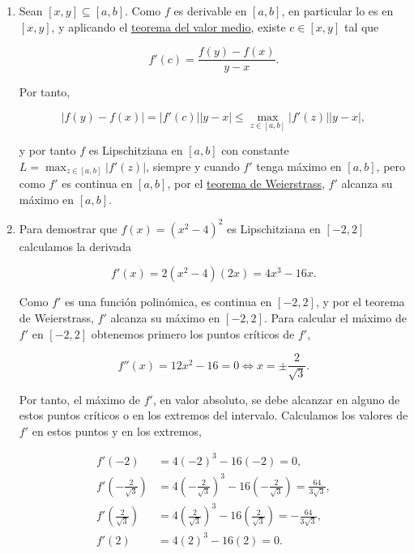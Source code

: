 \documentclass[
  spanish,
  a4paper,
]{scrreport}
\theoremstyle{definition}
\theoremstyle{remark}
\begin{document}
\begin{tcolorbox}[enhanced jigsaw, colbacktitle=quarto-callout-tip-color!10!white, opacityback=0, toptitle=1mm, title=\textcolor{quarto-callout-tip-color}{\faLightbulb}\hspace{0.5em}{Solución}, coltitle=black, opacitybacktitle=0.6, breakable, toprule=.15mm, leftrule=.75mm, titlerule=0mm, colframe=quarto-callout-tip-color-frame, left=2mm, bottomrule=.15mm, bottomtitle=1mm, arc=.35mm, rightrule=.15mm, colback=white]

\begin{enumerate}
\def\labelenumi{\alph{enumi}.}
\item
  Sean \([x,y]\subseteq [a,b]\). Como \(f\) es derivable en \([a,b]\),
  en particular lo es en \([x,y]\), y aplicando el
  \href{https://aprendeconalf.es/analisis-manual/07-derivadas.html\#thm-valor-medio}{teorema
  del valor medio}, existe \(c\in[x,y]\) tal que

  \[
  f'(c) = \frac{f(y)-f(x)}{y-x}.
  \]

  Por tanto,

  \[
  |f(y)-f(x)| = |f'(c)||y-x| \leq \max_{z\in [a,b]}|f'(z)||y-x|,
  \]

  y por tanto \(f\) es Lipschitziana en \([a,b]\) con constante
  \(L=\max_{z\in [a,b]}|f'(z)|\), siempre y cuando \(f'\) tenga máximo
  en \([a,b]\), pero como \(f'\) es continua en \([a,b]\), por el
  \href{https://aprendeconalf.es/analisis-manual/06-limites.html\#thm-weierstrass}{teorema
  de Weierstrass}, \(f'\) alcanza su máximo en \([a,b]\).
\item
  Para demostrar que \(f(x) = (x^2-4)^2\) es Lipschitziana en \([-2,2]\)
  calculamos la derivada

  \[
  f'(x) = 2(x^2-4)(2x) = 4x^3-16x.
  \]

  Como \(f'\) es una función polinómica, es continua en \([-2,2]\), y
  por el teorema de Weierstrass, \(f'\) alcanza su máximo en \([-2,2]\).
  Para calcular el máximo de \(f'\) en \([-2,2]\) obtenemos primero los
  puntos críticos de \(f'\),

  \[
  f''(x) = 12x^2-16 = 0 \Leftrightarrow x = \pm\frac{2}{\sqrt{3}}.
  \]

  Por tanto, el máximo de \(f'\), en valor absoluto, se debe alcanzar en
  alguno de estos puntos críticos o en los extremos del intervalo.
  Calculamos los valores de \(f'\) en estos puntos y en los extremos,

  \begin{align*}
  f'(-2) &= 4(-2)^3-16(-2) = 0,\\
  f'\left(-\frac{2}{\sqrt{3}}\right) &= 4\left(-\frac{2}{\sqrt{3}}\right)^3-16\left(-\frac{2}{\sqrt{3}}\right) = \frac{64}{3\sqrt{3}},\\
  f'\left(\frac{2}{\sqrt{3}}\right) &= 4\left(\frac{2}{\sqrt{3}}\right)^3-16\left(\frac{2}{\sqrt{3}}\right) = -\frac{64}{3\sqrt{3}},\\
  f'(2) &= 4(2)^3-16(2) = 0.
  \end{align*}


\end{enumerate}
\end{tcolorbox}
\end{document}
